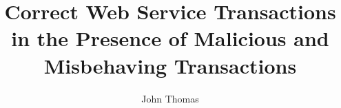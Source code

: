 \documentclass{styles/uscthesis}
\title{Correct Web Service Transactions in the Presence of Malicious and Misbehaving Transactions}
\author{John Thomas}{Ravan III}    %
\theoremstyle{definition}
\theoremstyle{plain}
\begin{document}
                          


\printbibliography %

\Appendix                 %
	
                        
\end{document}

